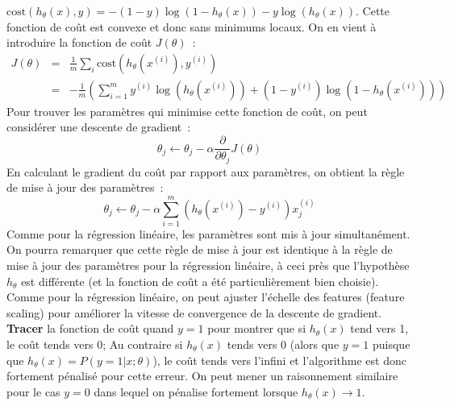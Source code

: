 \documentclass[10pt,a4paper]{article}
\begin{document}
$\mbox{cost}(h_\theta(x),y) = -(1-y)\log(1-h_\theta(x)) - y
\log(h_\theta(x))$. Cette fonction de coût est \mbox{convexe} et donc sans
minimums locaux. On en vient à introduire la fonction de coût
$J(\theta)$~:
\begin{eqnarray}
J(\theta) &=& \frac{1}{m}\sum_i \mbox{cost}(h_\theta(x^{(i)}),
y^{(i)})\\
&=& -\frac{1}{m} \left( \sum_{i=1}^m y^{(i)} \log(h_\theta(x^{(i)})) +
(1 - y^{(i)}) \log(1 - h_\theta(x^{(i)}))\right)
\end{eqnarray}
Pour trouver les paramètres qui minimise cette fonction de coût, on
peut considérer une descente de gradient~:
\begin{equation}
\theta_j \leftarrow \theta_{j} - \alpha \frac{\partial}{\partial \theta_j} J(\theta)
\end{equation}
En calculant le gradient du coût par rapport aux paramètres, on
obtient la règle de mise à jour des paramètres~:
\begin{equation}
\theta_j \leftarrow \theta_{j} - \alpha \sum_{i=1}^m
(h_\theta(x^{(i)}) - y^{(i)}) x_j^{(i)}
\end{equation}
Comme pour la régression linéaire, les paramètres sont mis à jour
simultanément. On pourra remarquer que cette règle de mise à jour est identique à la
règle de mise à jour des paramètres pour la régression linéaire, à
ceci près que l'hypothèse $h_\theta$ est différente (et la fonction de
coût a été particulièrement bien choisie). Comme pour la régression
linéaire, on peut ajuster l'échelle des features (feature scaling)
pour améliorer la vitesse de convergence de la descente de gradient.\\


\textbf{Tracer} la fonction de coût quand $y=1$ pour montrer que si
$h_\theta(x)$ tend vers 1, le coût tends vers 0; Au contraire si
$h_\theta(x)$ tends vers 0 (alors que $y=1$ puisque que $h_\theta(x) =
P(y=1|x; \theta)$), le coût tends vers l'infini et l'algorithme est
donc fortement pénalisé pour cette erreur. On peut mener un
raisonnement similaire pour le cas $y=0$ dans lequel on pénalise
fortement lorsque $h_\theta(x) \rightarrow 1$.\\
\end{document}
